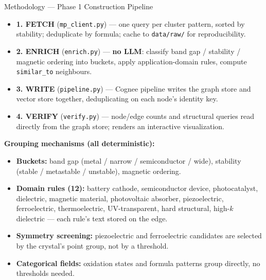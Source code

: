 \documentclass{beamer}
\begin{document}
\begin{frame}{Methodology --- Phase 1 Construction Pipeline}
    \begin{itemize}
        \item \textbf{1. FETCH} (\texttt{mp\_client.py}) --- one query per cluster pattern, sorted by stability; deduplicate by formula; cache to \texttt{data/raw/} for reproducibility.
        \item \textbf{2. ENRICH} (\texttt{enrich.py}) --- \textbf{no LLM}: classify band gap / stability / magnetic ordering into buckets, apply application-domain rules, compute \texttt{similar\_to} neighbours.
        \item \textbf{3. WRITE} (\texttt{pipeline.py}) --- Cognee pipeline writes the graph store and vector store together, deduplicating on each node's identity key.
        \item \textbf{4. VERIFY} (\texttt{verify.py}) --- node/edge counts and structural queries read directly from the graph store; renders an interactive visualization.
    \end{itemize}
    \vspace{0.15cm}
    \textbf{Grouping mechanisms (all deterministic):}
    \begin{itemize}\small
        \item \textbf{Buckets:} band gap (metal / narrow / semiconductor / wide), stability (stable / metastable / unstable), magnetic ordering.
        \item \textbf{Domain rules (12):} battery cathode, semiconductor device, photocatalyst, dielectric, magnetic material, photovoltaic absorber, piezoelectric, ferroelectric, thermoelectric, UV-transparent, hard structural, high-$k$ dielectric --- each rule's text stored on the edge.
        \item \textbf{Symmetry screening:} piezoelectric and ferroelectric candidates are selected by the crystal's point group, not by a threshold.
        \item \textbf{Categorical fields:} oxidation states and formula patterns group directly, no thresholds needed.
    \end{itemize}
\end{frame}
\end{document}

